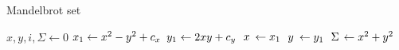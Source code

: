 \documentclass{article}
\newcommand{\Let}[2]{\State $\mathmakebox[1em]{#1} \gets #2$}
\begin{document}
\begin{algorithm}
  \caption{Mandelbrot set}
  \label{alg:mandelbrot}
  \begin{algorithmic}[1]
      \State $x, y, i, \Sigma \gets 0$
        \Let{x_1}{x^2 - y^2 + c_x}
        \Let{y_1}{2xy + c_y}
        \Let{x}{x_1}
        \Let{y}{y_1}
        \Let{\Sigma}{x^2 + y^2}
      \EndWhile
        \State {}
      \EndIf
      \State {}
    \EndFunction
  \end{algorithmic}
\end{algorithm}
\end{document}

